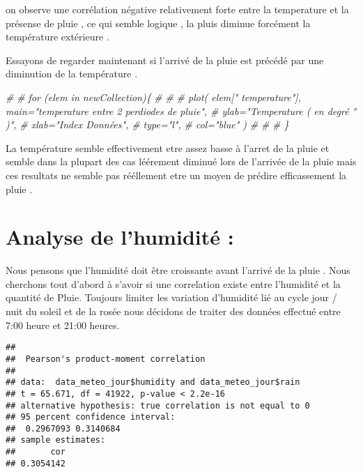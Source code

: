 \documentclass[
]{article}
\newenvironment{Shaded}{\begin{snugshade}}{\end{snugshade}}
\newcommand{\CommentTok}[1]{\textcolor[rgb]{0.56,0.35,0.01}{\textit{#1}}}
\newcommand{\FunctionTok}[1]{\textcolor[rgb]{0.00,0.00,0.00}{#1}}
\newcommand{\NormalTok}[1]{#1}
\newcommand{\SpecialCharTok}[1]{\textcolor[rgb]{0.00,0.00,0.00}{#1}}
\begin{document}
on observe une corrélation négative relativement forte entre la
temperature et la présense de pluie , ce qui semble logique , la pluis
diminue forcément la température extérieure .

Essayons de regarder maintenant si l'arrivé de la pluie est précédé par
une diminution de la température .

\begin{Shaded}
\begin{Highlighting}[]
\CommentTok{\# }
\CommentTok{\# for (elem in newCollection)\{}
\CommentTok{\#    }
\CommentTok{\# }
\CommentTok{\#     plot( elem[" temperature"], main="temperature  entre 2 perdiodes de pluie",}
\CommentTok{\#           ylab="Temperature ( en degré ° )",}
\CommentTok{\#           xlab="Index Données",}
\CommentTok{\#           type="l",}
\CommentTok{\#           col="blue"  )}
\CommentTok{\# }
\CommentTok{\#   }
\CommentTok{\# \}}
\end{Highlighting}
\end{Shaded}

La température semble effectivement etre assez basse à l'arret de la
pluie et semble dans la plupart des cas léérement diminué lors de
l'arrivée de la pluie mais ces resultats ne semble pas rééllement etre
un moyen de prédire efficassement la pluie .

\hypertarget{analyse-de-lhumidituxe9}{%
\section{Analyse de l'humidité :}\label{analyse-de-lhumidituxe9}}

Nous pensons que l'humidité doit être croissante avant l'arrivé de la
pluie . Nous cherchons tout d'abord à s'avoir si une correlation existe
entre l'humidité et la quantité de Pluie. Toujours limiter les variation
d'humidité lié au cycle jour / nuit du soleil et de la rosée nous
décidons de traiter des données effectué entre 7:00 heure et 21:00
heures.

\begin{Shaded}
\end{Shaded}

\begin{verbatim}
## 
##  Pearson's product-moment correlation
## 
## data:  data_meteo_jour$humidity and data_meteo_jour$rain
## t = 65.671, df = 41922, p-value < 2.2e-16
## alternative hypothesis: true correlation is not equal to 0
## 95 percent confidence interval:
##  0.2967093 0.3140684
## sample estimates:
##       cor 
## 0.3054142
\end{verbatim}
\end{document}
